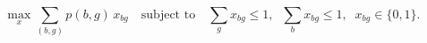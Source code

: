 \begin{equation}
\max_{x} \sum_{(b,g)} p(b,g)\, x_{bg}
\quad \text{subject to} \quad
\sum_{g} x_{bg} \le 1,\;\; \sum_{b} x_{bg} \le 1,\;\; x_{bg} \in \{0,1\}.
\label{eq:assignment}
\end{equation}
